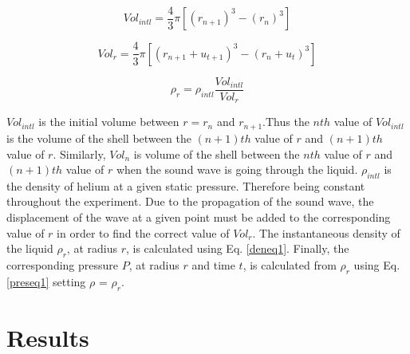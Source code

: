 \begin{equation}\label{radeq1}
Vol_{intl} = \frac{4}{3}\pi [(r_{n+1})^3 - (r_n)^3]
\end{equation}

\begin{equation}\label{radeq2}
Vol_r = \frac{4}{3}\pi [(r_{n+1} + u_{t+1})^3 - (r_n + u_t)^3]
\end{equation}

\begin{equation}\label{deneq1}
\rho_r = \rho_{intl} \frac{Vol_{intl}}{Vol_r}
\end{equation}

$Vol_{intl}$ is the initial volume between $r = r_n$ and $r_{n+1}$.Thus the $nth$ value of $Vol_{intl}$ is the volume of the shell between the $(n+1)th$ value of $r$ and $(n+1)th$ value of $r$. Similarly, $Vol_n$ is volume of the shell between the $nth$ value of $r$ and $(n+1)th$ value of $r$ when the sound wave is going through the liquid. $\rho_{intl}$ is the density of helium at a given static pressure. Therefore being constant throughout the experiment. Due to the propagation of the sound wave, the displacement of the wave at a given point must be added to the corresponding value of $r$ in order to find the correct value of $Vol_r$. The instantaneous density of the liquid $\rho_r$, at radius $r$, is calculated using Eq. \ref{deneq1}. Finally, the corresponding pressure $P$, at radius $r$ and time $t$, is calculated from $\rho_r$ using Eq. \ref{preseq1} setting $\rho$ = $\rho_r$.

\section{Results}

